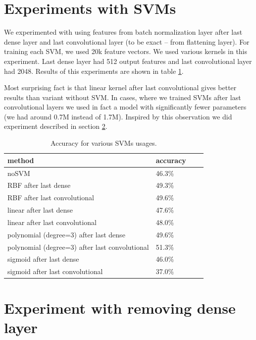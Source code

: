 \documentclass[a4paper]{article}
\begin{document}
\section{Experiments with SVMs}

We experimented with using features from batch normalization layer after last dense layer and last convolutional layer (to be exact -- from flattening layer).
For training each SVM, we used 20k feature vectors.
We used various kernels in this experiment.
Last dense layer had 512 output features and last convolutional layer had 2048.
Results of this experiments are shown in table \ref{table:svm}.

Most surprising fact is that linear kernel after last convolutional gives
better results than variant without SVM.
In cases, where we trained SVMs after last convolutional layers we
used in fact a model with significantly fewer parameters (we had around 0.7M instead of 1.7M).
Inspired by this observation we did experiment described in section \ref{last}.

\begin{table}[!h]
    \caption{Accuracy for various SVMs usages.
    \label{table:svm}
    }
\begin{center}
    \begin{tabular}{| l | l | l | l |}
    \hline
    method&accuracy \\
    \hline
        noSVM & 46.3\% \\
        RBF after last dense & 49.3\% \\
        RBF after last convolutional & 49.6\% \\
        linear after last dense & 47.6\% \\
        linear after last convolutional & 48.0\% \\
        polynomial (degree=3) after last dense & 49.6\% \\
        polynomial (degree=3) after last convolutional & 51.3\% \\
        sigmoid after last dense & 46.0\% \\
        sigmoid after last convolutional & 37.0\% \\
    \hline
    \end{tabular}
\end{center}
\end{table}

\section{Experiment with removing dense layer}
\label{last}
\end{document}
